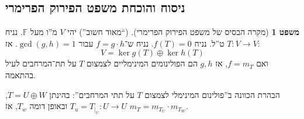 \documentclass[a4paper]{article}
\newcommand\F         {\mathbb{F}}
\newcommand\co        {\colon}
\theoremstyle{definition}
\newtheorem{Theorem}{\color{myblue}משפט}
\begin{document}
	\subsection{ניסוח והוכחת משפט הפירוק הפרימרי}
	\begin{Theorem}[מקרה הבסיס של משפט הפירוק הפרימרי]
		(``מאוד חשוב'') יהי $V$ מ''ו מעל $\F$. נניח $T \co V \to V$ ט''ל. נניח $f(T) = 0$. נניח ש־$f = g \cdot h$ עבור $\gcd(g, h) = 1$. אז: 
		\[ V = \ker g(T) \oplus \ker h(T) \]
		ואם $f = m_T$, אז $g, h$ הם הפולינומים המינימליים לצמצום $T$ על תת־המרחבים לעיל בהתאמה. 
	\end{Theorem}
	הבהרת הכוונה ב''פולינום המינימלי לצמצום $T$ על תתי המרחבים'': בהינתן $T = U \oplus W$, $T_u = T_{\mid_U} \co U \to U$ ובאופן דומה $T_w$, אז $m_T = m_{T_U} \cdot m_{T_W}$. 
\end{document}
